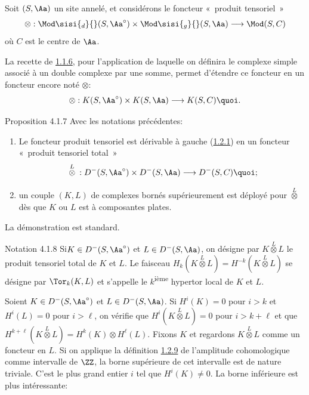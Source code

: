 \documentclass[10pt]{../fichiers-configuration-latex/smfart}
\begin{document}
\setcounter{subsubsection}{5}
\subsubsection{}
Soit $(S,\Aa)$ un site annelé, et considérons le foncteur « produit tensoriel »
\[
\otimes:\Mod\sisi{_d}{}(S,\Aa^{\circ})\times
\Mod\sisi{_g}{}(S,\Aa)\longrightarrow \Mod(S,C)
\]%
où $C$ est le centre de $\Aa$.

La recette de \hyperref[XVII.subsubsec1.1.6]{1.1.6}, pour l'application de laquelle on définira le
complexe simple associé à un double complexe par une somme, permet
d'étendre ce foncteur en un foncteur encore noté $\otimes$:
\[
\otimes:K(S,\Aa^{\circ})\times K(S,\Aa)\longrightarrow
K(S,C){\quoi}.
\]

\begin{enonce*}{Proposition 4.1.7}
Avec les notations précédentes:
\begin{enumerate}
\renewcommand{\theenumi}{\roman{enumi}}
\renewcommand{\labelenumi}{(\theenumi)}
\item Le foncteur produit tensoriel est dérivable à gauche (\hyperref[XVII.def1.2.1]{1.2.1})
en un foncteur « produit tensoriel total »
\[
{}\overset{L}{\otimes}{}:D^{-}(S,\Aa^{\circ})\times
D^{-}(S,\Aa)\longrightarrow D^{-}(S,C){\quoi}\text{;}
\]

\item un couple $(K,L)$ de complexes bornés supérieurement est déployé
pour $\overset{L}{\otimes}$ dès que $K$ ou $L$ est à
composantes plates.
\end{enumerate}
\end{enonce*}

La démonstration est standard.

\begin{enonce*}{Notation 4.1.8}
Si\pageoriginale $K\in D^{-}(S,\Aa^{\circ})$ et $L\in D^{-}(S,\Aa)$,
on désigne par $K\overset{L}{\otimes}L$ le produit
tensoriel total de $K$ et $L$. Le faisceau
$H_{k}(K\overset{L}{\otimes}L)=H^{-k}
(K\overset{L}{\otimes}L)$
se désigne par $\Tor_{k}(K,L)$ et s'appelle le $k$\textsuperscript{ième}
hypertor local de $K$ et $L$.
\end{enonce*}

Soient $K\in D^{-}(S,\Aa^{\circ})$ et $L\in
D^{-}(S,\Aa)$. Si $H^{i}(K)=0$ pour $i>k$ et $H^{i}(L)=0$ pour
$i>\ell$, on vérifie que
$H^{i}(K\overset{L}{\otimes}L)=0$ pour $i>k+\ell$ et
que $H^{k+\ell}(K\overset{L}{\otimes}L)=H^{k}(K)\otimes
H^{\ell}(L)$. Fixons $K$ et regardons
$K\overset{L}{\otimes}L$ comme un foncteur en $L$. Si
on applique la définition \hyperref[XVII.def1.2.9]{1.2.9} de l'amplitude cohomologique comme
intervalle de $\ZZ$, la borne supérieure de cet intervalle est
de nature triviale. C'est le plus grand entier $i$ tel que
$H^{i}(K)\neq 0$. La borne inférieure est plus intéressante:
\end{document}
